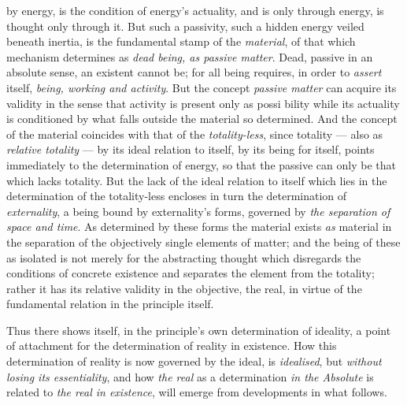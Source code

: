 \documentclass[12pt,a4paper]{book}
\begin{document}
by energy, is the condition of energy's actuality, and is only through energy,
is thought only through it. But such a passivity, such a hidden energy veiled
beneath inertia, is the fundamental stamp of the \emph{material}, of that
which mechanism determines as \emph{dead being, as passive matter}. Dead,
passive in an absolute sense, an existent cannot be; for all being requires,
in order to \emph{assert} itself, \emph{being, working and activity}. But the
concept \emph{passive matter} can acquire its validity in the sense that
activity is present only as possi\-%
bility while its actuality is conditioned by what falls outside the material
so determined. And the concept of the material coincides with that of the
\emph{totality-less}, since totality --- also as \emph{relative totality} ---
by its ideal relation to itself, by its being for itself, points immediately
to the determination of energy, so that the passive can only be that which
lacks totality. But the lack of the ideal relation to itself which lies in the
determination of the totality-less encloses in turn the determination of
\emph{externality}, a being bound by externality's forms, governed by
\emph{the separation of space and time}. As determined by these forms the
material exists \emph{as} material in the separation of the objectively single
elements of matter; and the being of these as isolated is not merely for the
abstracting thought which disregards the conditions of concrete existence and
separates the element from the totality; rather it has its relative validity
in the objective, the real, in virtue of the fundamental relation in the
principle itself.

Thus there shows itself, in the principle's own determination of ideality, a
point of attachment for the determination of reality in existence. How this
determination of reality is now governed by the ideal, is \emph{idealised},
but \emph{without losing its essentiality}, and how \emph{the real} as a
determination \emph{in the Absolute} is related to \emph{the real in
existence}, will emerge from developments in what follows.
\end{document}
